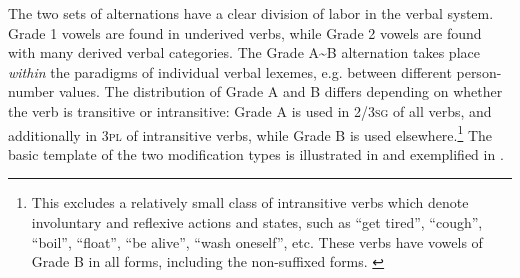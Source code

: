 \documentclass[output=paper,newtxmath,modfonts,nonflat]{langsci/langscibook}
\begin{document}
The two sets of alternations have a clear division of labor in the verbal system. Grade 1 vowels are found in underived verbs, while Grade 2 vowels are found with many derived verbal categories. The Grade A{\textasciitilde}B alternation takes place \textit{within} the paradigms of individual verbal lexemes, e.g. between different  person-number values. The distribution of Grade A and B differs depending on whether the verb is transitive or intransitive: Grade A is used in 2/3\textsc{sg} of all verbs, and additionally in 3\textsc{pl} of intransitive verbs, while Grade B is used elsewhere.\footnote{This excludes a relatively small class of intransitive verbs which denote involuntary and reflexive actions and states, such as “get tired”, “cough”, “boil”, “float”, “be alive”, “wash oneself”, etc. These verbs have vowels of Grade B in all forms, including the non-suffixed forms. \label{fn:monich:5} }  The basic template of the two  modification types is illustrated in  and exemplified in . 



\begin{table}[!htb]
\caption{Distribution of Grades A{\textasciitilde}B in inflected verbal forms}
\label{tab:monich:5}
\end{table}
\end{document}
